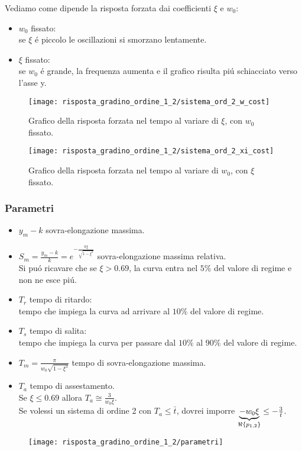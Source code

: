 \documentclass[../main.tex]{subfiles}
\begin{document}
		Vediamo come dipende la risposta forzata dai coefficienti $ \xi $ e $ w_0 $:
		\begin{itemize}
			\item 
				$ w_0 $ fissato:\\
				se $ \xi $ \'e piccolo le oscillazioni si smorzano lentamente.
			\item 
				$ \xi $ fissato:\\
				se $ w_0 $ \'e grande, la frequenza aumenta e il grafico risulta pi\'u schiacciato verso l'asse y.
		\end{itemize}
		\begin{figure}[H]
			\centering
			\texttt{[image: risposta\_gradino\_ordine\_1\_2/sistema\_ord\_2\_w\_cost]}
			\caption{Grafico della risposta forzata nel tempo al variare di $ \xi $, con $ w_0 $ fissato.}
		\end{figure} 
		\begin{figure}[H]
			\centering
			\texttt{[image: risposta\_gradino\_ordine\_1\_2/sistema\_ord\_2\_xi\_cost]}
			\caption{Grafico della risposta forzata nel tempo al variare di $ w_0 $, con $ \xi $ fissato.}
		\end{figure}
		
	\subsubsection{Parametri}
		\begin{itemize}
			\item 
				$ y_m - k $ sovra-elongazione massima.
			\item 
				$ S_m = \frac{y_m-k}{k} = e^{-\frac{\pi \xi}{\sqrt{1-\xi^2}}} $ sovra-elongazione massima relativa.\\
				Si pu\'o ricavare che se $ \xi > 0.69 $, la curva entra nel $ 5\% $ del valore di regime e non ne esce pi\'u.
			\item 
				$ T_r $ tempo di ritardo:\\ 
			tempo che impiega la curva ad arrivare al $ 10\% $ del valore di regime.
			\item 
				$ T_s $ tempo di salita:\\
			tempo che impiega la curva per passare dal $ 10\% $ al $ 90\% $ del valore di regime.
			\item 
				$ T_m = \frac{\pi}{w_0 \sqrt{1-\xi^2}} $ tempo di sovra-elongazione massima.
			\item 
				$ T_a $ tempo di assestamento.\\
				Se $ \xi \leq 0.69 $ allora $ T_a \cong \frac{3}{w_0 \xi} $.\\
				Se volessi un sistema di ordine 2 con $ T_a \leq \bar t $, dovrei imporre $ \underbrace{-w_0 \xi}_{ \Re \left\lbrace p_{1,2} \right\rbrace } \leq -\frac{3}{\bar t} $.
		\end{itemize}
		\begin{figure}[H]
			\centering
			\texttt{[image: risposta\_gradino\_ordine\_1\_2/parametri]}
		\end{figure}
		
\end{document}
